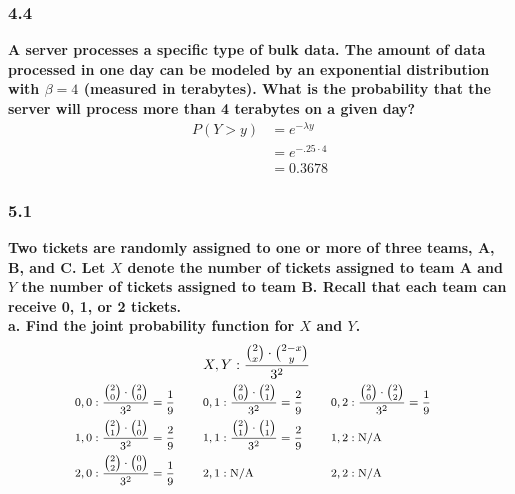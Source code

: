 \documentclass[
	a4paper, %
	10pt, %
	unnumberedsections, %
	twoside, %
]{LTJournalArticle}
\begin{document}
\subsubsection{4.4}
\textbf{A server processes a specific type of bulk data. The amount of data processed in one day can be modeled by an exponential distribution with $\beta = 4$ (measured in terabytes). What is the probability that the server will process more than 4 terabytes on a given day?}
\begin{equation*}
    \begin{aligned}
        P(Y > y) &= e^{-\lambda y} \\
        &= e^{-.25 \cdot 4} \\
        &= 0.3678
    \end{aligned}
\end{equation*}
\vspace*{1pt}\noindent
\subsubsection{5.1}
\textbf{Two tickets are randomly assigned to one or more of three teams, A, B, and C. Let $X$ denote the number of tickets assigned to team A and $Y$ the number of tickets assigned to team B. Recall that each team can receive 0, 1, or 2 tickets.} \\

\textbf{a. Find the joint probability function for $X$ and $Y$.}
\begin{equation*}
    \begin{aligned}
        &&&X, Y: \frac{{\binom{2}{x} \cdot \binom{2-x}{y}}}{3^2} \\
        &\text{\footnotesize$0, 0: \frac{\binom{2}{0} \cdot \binom{2}{0}}{3^2} = \frac{1}{9}$} \quad
        &&\text{\footnotesize$0, 1: \frac{\binom{2}{0} \cdot \binom{2}{1}}{3^2} = \frac{2}{9}$} \quad
        &&\text{\footnotesize$0, 2: \frac{\binom{2}{0} \cdot \binom{2}{2}}{3^2} = \frac{1}{9}$} \\
        &\text{\footnotesize$1, 0: \frac{\binom{2}{1} \cdot \binom{1}{0}}{3^2} = \frac{2}{9}$} \quad
        &&\text{\footnotesize$1, 1: \frac{\binom{2}{1} \cdot \binom{1}{1}}{3^2} = \frac{2}{9}$} \quad
        &&\text{\footnotesize$1, 2: \text{N/A}$} \\
        &\text{\footnotesize$2, 0: \frac{\binom{2}{2} \cdot \binom{0}{0}}{3^2} = \frac{1}{9}$} \quad
        &&\text{\footnotesize$2, 1: \text{N/A}$} \quad
        &&\text{\footnotesize$2, 2: \text{N/A}$} \\
    \end{aligned}
\end{equation*}
\end{document}
